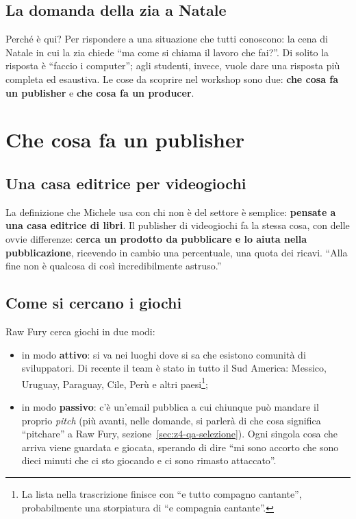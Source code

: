 \subsection{La domanda della zia a Natale}

Perché è qui? Per rispondere a una situazione che tutti conoscono: la cena di
Natale in cui la zia chiede ``ma come si chiama il lavoro che fai?''. Di solito
la risposta è ``faccio i computer''; agli studenti, invece, vuole dare una
risposta più completa ed esaustiva. Le cose da scoprire nel workshop sono due:
\textbf{che cosa fa un publisher} e \textbf{che cosa fa un producer}.

\section{Che cosa fa un publisher}
\label{sec:z4-publisher}

\subsection{Una casa editrice per videogiochi}

La definizione che Michele usa con chi non è del settore è semplice:
\textbf{pensate a una casa editrice di libri}. Il publisher di videogiochi fa
la stessa cosa, con delle ovvie differenze: \textbf{cerca un prodotto da
pubblicare e lo aiuta nella pubblicazione}, ricevendo in cambio una
percentuale, una quota dei ricavi. ``Alla fine non è qualcosa di così
incredibilmente astruso.''

\subsection{Come si cercano i giochi}

Raw Fury cerca giochi in due modi:
\begin{itemize}
  \item in modo \textbf{attivo}: si va nei luoghi dove si sa che esistono
        comunità di sviluppatori. Di recente il team è stato in tutto il Sud
        America: Messico, Uruguay, Paraguay, Cile, Perù e altri
        paesi\footnote{La lista nella trascrizione finisce con ``e tutto
        compagno cantante'', probabilmente una storpiatura di ``e compagnia
        cantante''.};
  \item in modo \textbf{passivo}: c'è un'email pubblica a cui chiunque può
        mandare il proprio \emph{pitch} (più avanti, nelle domande, si parlerà
        di che cosa significa ``pitchare'' a Raw Fury,
        sezione~\ref{sec:z4-qa-selezione}). Ogni singola cosa che arriva viene
        guardata e giocata, sperando di dire ``mi sono accorto che sono dieci
        minuti che ci sto giocando e ci sono rimasto attaccato''.
\end{itemize}

